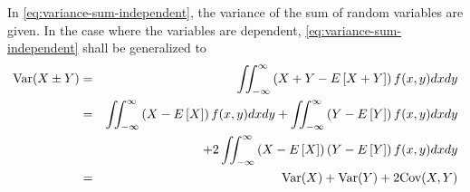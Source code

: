 In \eqref{eq:variance-sum-independent}, the variance of the sum of random variables are given. In the case where the variables are dependent, \eqref{eq:variance-sum-independent} shall be generalized to
\begin{eqnarray}
	\textup{Var}(X\pm Y) &=& \iint_{-\infty}^{\infty} \left(X + Y - E\left[X + Y\right]\right)f(x,y)dxdy \nonumber \\
	&=& \iint_{-\infty}^{\infty} \left(X - E\left[X\right]\right)f(x,y)dxdy + \iint_{-\infty}^{\infty} \left(Y - E\left[Y\right]\right)f(x,y)dxdy \nonumber \\
	&& + 2\iint_{-\infty}^{\infty} \left(X - E\left[X\right]\right)\left(Y - E\left[Y\right]\right)f(x,y)dxdy \nonumber \\
	&=& \textup{Var}(X) + \textup{Var}(Y) + 2\textup{Cov}(X, Y) \nonumber
\end{eqnarray}

